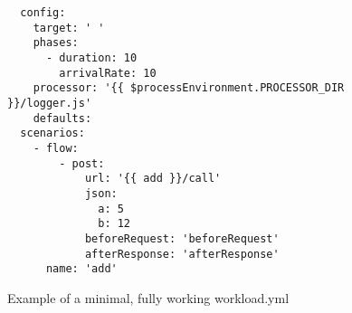\documentclass[../main.tex]{subfiles}
\begin{document}
\begin{figure}[H]
  \begin{tcolorbox}[titleDetachedStyle, title=\texttt{workload.yml}]
  \begin{verbatim}
  config:
    target: ' '
    phases:
      - duration: 10
        arrivalRate: 10
    processor: '{{ $processEnvironment.PROCESSOR_DIR }}/logger.js'
    defaults:
  scenarios:
    - flow:
        - post:
            url: '{{ add }}/call'
            json:
              a: 5
              b: 12
            beforeRequest: 'beforeRequest'
            afterResponse: 'afterResponse'
      name: 'add'
  \end{verbatim}
\end{tcolorbox}
\caption{Example of a minimal, fully working workload.yml}%
\label{fig:exampleWorkloadYML}
\end{figure}
\end{document}
